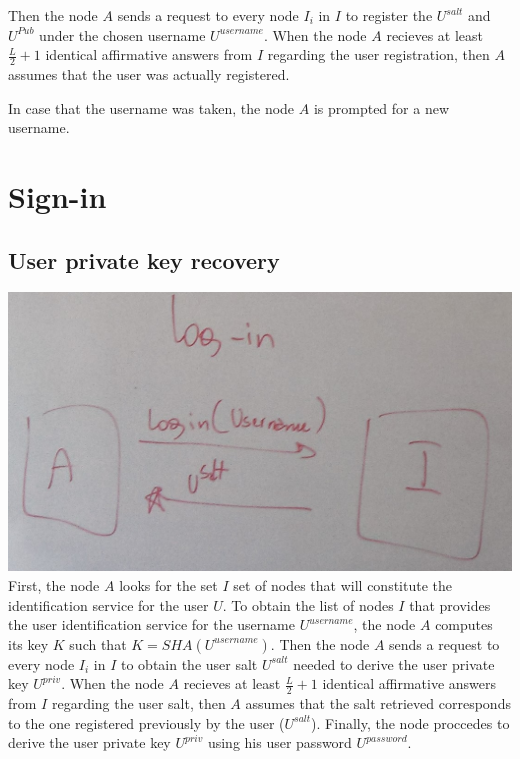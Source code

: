 Then the node $A$ sends a request to every node $I_i$ in $I$ to register the
$U^{salt}$ and $U^{Pub}$ under the chosen  username  $U^{username}$. When the node
$A$ recieves at least $\frac{L}{2} + 1$ identical affirmative answers from
$I$ regarding the user registration, then $A$ assumes that the user was
actually registered.

In case that the username was taken,
the node $A$ is prompted for a new username.


\section{Sign-in}

\subsection{User private key recovery}
\label{sec:private_key_recovery}
\includegraphics[width=14cm]{../img/login_protocol_mockup}\\

First, the node $A$ looks for the set $I$ set of nodes that will constitute the
identification service for the user $U$.
To obtain the list of nodes $I$ that provides the user identification service for
the username $U^{username}$, the node $A$ computes its key $K$ such that $K =
SHA(U^{username})$. 
Then the node $A$ sends a request to every node $I_i$ in $I$ to obtain the user
salt $U^{salt}$ needed to derive the user private key $U^{priv}$.
 When the node $A$ recieves at least $\frac{L}{2} + 1$ identical affirmative answers from
$I$ regarding the user salt, then $A$ assumes that the salt retrieved
corresponds to the one registered previously by the user ($U^{salt}$). Finally,
the node proccedes to derive the user private key $U^{priv}$ using his user password $U^{password}$.

